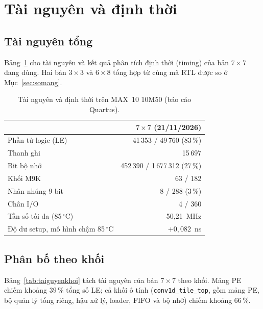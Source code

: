 \section{Tài nguyên và định thời}\label{sec:taiguyen}
\subsection{Tài nguyên tổng}
Bảng~\ref{tab:taiguyen} cho tài nguyên và kết quả phân tích định thời (timing) của bản $7\times7$ đang dùng.
Hai bản $3\times3$ và $6\times8$ tổng hợp từ cùng mã RTL được so ở Mục~\ref{sec:somang}.

\begin{table}[htbp]\centering
\caption{Tài nguyên và định thời trên MAX~10 10M50 (báo cáo Quartus).}\label{tab:taiguyen}
\small\setlength{\tabcolsep}{5pt}
\begin{tabular}{@{}lr@{}}
\toprule
 & $7\times7$ (21/11/2026) \\ \midrule
Phần tử logic (LE) & 41\,353 / 49\,760 (83\,\%) \\
Thanh ghi & 15\,697 \\
Bit bộ nhớ & 452\,390 / 1\,677\,312 (27\,\%) \\
Khối M9K & 63 / 182 \\
Nhân nhúng 9 bit & 8 / 288 (3\,\%) \\
Chân I/O & 4 / 360 \\ \midrule
Tần số tối đa (85\,$^\circ$C) & 50{,}21~MHz \\
Độ dư setup, mô hình chậm 85\,$^\circ$C & $+0{,}082$~ns \\ \bottomrule
\end{tabular}
\end{table}

\subsection{Phân bố theo khối}
Bảng~\ref{tab:taiguyenkhoi} tách tài nguyên của bản $7\times7$ theo khối.
Mảng PE chiếm khoảng $39\,\%$ tổng số LE; cả khối ô tính (\texttt{conv1d\_tile\_top}, gồm mảng PE, bộ quản lý tổng riêng, hậu xử lý, loader, FIFO và bộ nhớ) chiếm khoảng $66\,\%$.

